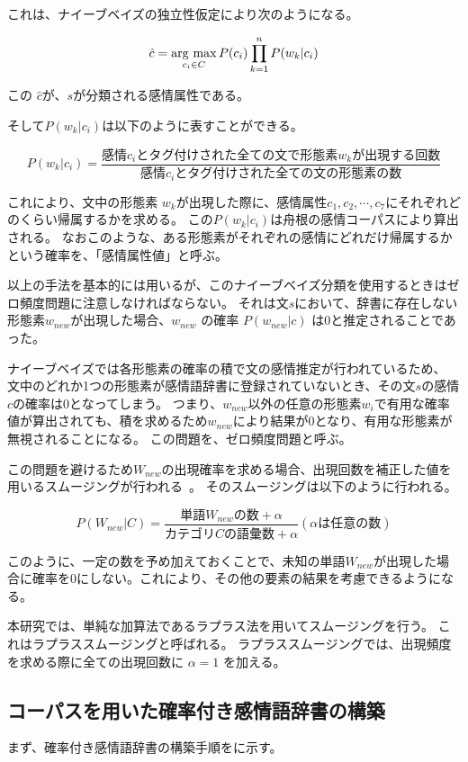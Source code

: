 \documentclass[11pt,a4j]{jsarticle}
\newcommand{\argmax}{\mathop{\rm arg~max}\limits}
\begin{document}
これは、ナイーブベイズの独立性仮定により次のようになる。

\[
  \hat{c}=\argmax_{c_i \in C} P(c_i)\prod_{k=1}^n P(w_k|c_i)
\]

この $\hat{c}$が、$s$が分類される感情属性である。

そして$P(w_k|c_i)$は以下のように表すことができる。

\[
P(w_k|c_i)=\frac{感情 c_i とタグ付けされた全ての文で形態素 w_k が出現する回数}{感情 c_i とタグ付けされた全ての文の形態素の数}
\]

これにより、文中の形態素 $w_k$が出現した際に、感情属性$c_1,c_2, \cdots ,c_7$にそれぞれどのくらい帰属するかを求める。
この$P(w_k|c_i)$は舟根の感情コーパスにより算出される。
なおこのような、ある形態素がそれぞれの感情にどれだけ帰属するかという確率を、「感情属性値」と呼ぶ。

以上の手法を基本的には用いるが、このナイーブベイズ分類を使用するときはゼロ頻度問題に注意しなければならない。
それは文$s$において、辞書に存在しない形態素$w_\mathit{new}$が出現した場合、$w_\mathit{new}$ の確率 $P(w_\mathit{new}|c)$ は0と推定されることであった。

ナイーブベイズでは各形態素の確率の積で文の感情推定が行われているため、
文中のどれか1つの形態素が感情語辞書に登録されていないとき、その文$s$の感情$c$の確率は0となってしまう。
つまり、$w_\mathit{new}$以外の任意の形態素$w_i$で有用な確率値が算出されても、積を求めるため$w_\mathit{new}$により結果が0となり、有用な形態素が無視されることになる。
この問題を、ゼロ頻度問題と呼ぶ。

この問題を避けるため$W_\mathit{new}$の出現確率を求める場合、出現回数を補正した値を用いるスムージングが行われる~。
そのスムージングは以下のように行われる。

\[
  P(W_\mathit{new}|C)=\frac{単語 W_\mathit{new} の数 + \alpha }{カテゴリC の語彙数 + \alpha }(\alpha は任意の数)
\]

このように、一定の数を予め加えておくことで、未知の単語$W_\mathit{new}$が出現した場合に確率を0にしない。これにより、その他の要素の結果を考慮できるようになる。

本研究では、単純な加算法であるラプラス法を用いてスムージングを行う。
これはラプラススムージングと呼ばれる。
ラプラススムージングでは、出現頻度を求める際に全ての出現回数に $\alpha=1$ を加える。
 

  \subsection{コーパスを用いた確率付き感情語辞書の構築}\label{sec:tweetcorpus}
まず、確率付き感情語辞書の構築手順をに示す。
\end{document}
